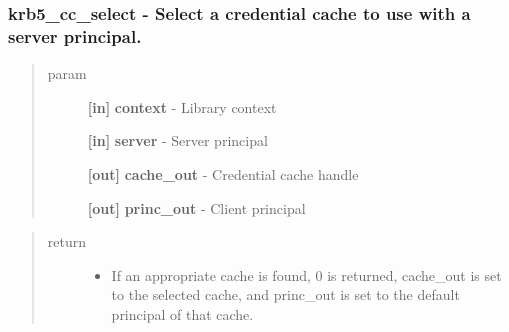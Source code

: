 \documentclass[letterpaper,10pt,english]{sphinxmanual}
\begin{document}
\subsubsection{krb5\_cc\_select -  Select a credential cache to use with a server principal.}
\label{appdev/refs/api/krb5_cc_select::doc}\label{appdev/refs/api/krb5_cc_select:krb5-cc-select-select-a-credential-cache-to-use-with-a-server-principal}

\begin{fulllineitems}
\label{appdev/refs/api/krb5_cc_select:c.krb5_cc_select}
\end{fulllineitems}

\begin{quote}\begin{description}
\item[{param}] \leavevmode
\textbf{{[}in{]}} \textbf{context} - Library context

\textbf{{[}in{]}} \textbf{server} - Server principal

\textbf{{[}out{]}} \textbf{cache\_out} - Credential cache handle

\textbf{{[}out{]}} \textbf{princ\_out} - Client principal

\end{description}\end{quote}
\begin{quote}\begin{description}
\item[{return}] \leavevmode\begin{itemize}
\item {} 
If an appropriate cache is found, 0 is returned, cache\_out is set to the selected cache, and princ\_out is set to the default principal of that cache.

\end{itemize}

\end{description}\end{quote}
\end{document}
